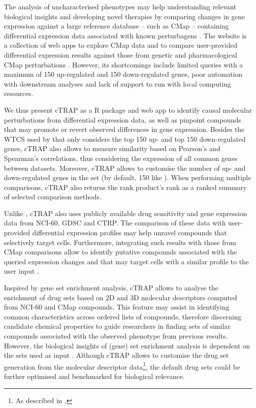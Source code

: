 The analysis of uncharacterised phenotypes may help understanding relevant biological insights and developing novel therapies by comparing changes in gene expression against a large reference database -- such as CMap -- containing differential expression data associated with known perturbagens \cite{subramanian:2017ul,hughes:2000ww}. The  website is a collection of web apps to explore CMap data and to compare user-provided differential expression results against those from genetic and pharmacological CMap perturbations \cite{subramanian:2017ul}. However, its shortcomings include limited queries with a maximum of 150 up-regulated and 150 down-regulated genes, poor automation with downstream analyses and lack of support to run with local computing resources.

We thus present cTRAP as a R package and web app to identify causal molecular perturbations from differential expression data, as well as pinpoint compounds that may promote or revert observed differences in gene expression. Besides the WTCS used by  that only considers the top 150 up- and top 150 down-regulated genes, cTRAP also allows to measure similarity based on Pearson's and Spearman's correlations, thus considering the expression of all common genes between datasets. Moreover, cTRAP allows to customise the number of up- and down-regulated genes in the set (by default, 150 like ). When performing multiple comparisons, cTRAP also returns the rank product's rank as a ranked summary of selected comparison methods.

Unlike , cTRAP also uses publicly available drug sensitivity and gene expression data from NCI-60, GDSC and CTRP. The comparison of these data with user-provided differential expression profiles may help unravel compounds that selectively target cells. Furthermore, integrating such results with those from CMap comparisons allow to identify putative compounds associated with the queried expression changes and that may target cells with a similar profile to the user input \cite{almeida:2019wh}.

Inspired by gene set enrichment analysis, cTRAP allows to analyse the enrichment of drug sets based on 2D and 3D molecular descriptors computed from NCI-60 and CMap compounds. This feature may assist in identifying common characteristics across ordered lists of compounds, therefore discerning candidate chemical properties to guide researchers in finding sets of similar compounds associated with the observed phenotype from previous results. However, the biological insights of (gene) set enrichment analysis is dependent on the sets used as input \cite{davies:2010wf}. Although cTRAP allows to customise the drug set generation from the molecular descriptor data\footnote{As described in .}, the default drug sets could be further optimised and benchmarked for biological relevance.

